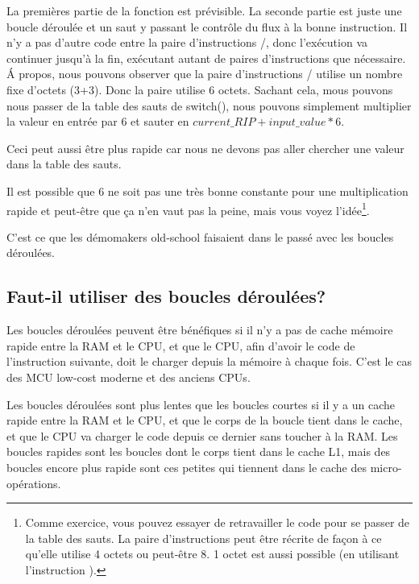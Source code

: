 La premières partie de la fonction est prévisible.
La seconde partie est juste une boucle déroulée et un saut y passant le contrôle
du flux à la bonne instruction.
Il n'y a pas d'autre code entre la paire d'instructions /, donc l'exécution
va continuer jusqu'à la fin, exécutant autant de paires d'instructions que nécessaire.
Á propos, nous pouvons observer que la paire d'instructions / utilise
un nombre fixe d'octets (3+3). Donc la paire utilise 6 octets.
Sachant cela, mous pouvons nous passer de la table des sauts de switch(), nous pouvons
simplement multiplier la valeur en entrée par 6 et sauter en $current\_RIP + input\_value * 6$.

Ceci peut aussi être plus rapide car nous ne devons pas aller chercher une valeur
dans la table des sauts.

Il est possible que 6 ne soit pas une très bonne constante pour une multiplication
rapide et peut-être que ça n'en vaut pas la peine, mais vous voyez l'idée\footnote{Comme
exercice, vous pouvez essayer de retravailler le code pour se passer de la table
des sauts.
La paire d'instructions peut être récrite de façon à ce qu'elle utilise 4 octets
ou peut-être 8.
1 octet est aussi possible (en utilisant l'instruction ).}.

C'est ce que les démomakers old-school faisaient dans le passé avec les boucles déroulées.

\subsection{Faut-il utiliser des boucles déroulées?}

Les boucles déroulées peuvent être bénéfiques si il n'y a pas de cache mémoire rapide
entre la \ac{RAM} et le \ac{CPU}, et que le \ac{CPU}, afin d'avoir le code de l'instruction
suivante, doit le charger depuis la mémoire à chaque fois.
C'est le cas des \ac{MCU} low-cost moderne et des anciens \ac{CPU}s.

Les boucles déroulées sont plus lentes que les boucles courtes si il y a un cache
rapide entre la \ac{RAM} et le \ac{CPU}, et que le corps de la boucle tient dans
le cache, et que le \ac{CPU} va charger le code depuis ce dernier sans toucher à
la \ac{RAM}.
Les boucles rapides sont les boucles dont le corps tient dans le cache L1, mais des
boucles encore plus rapide sont ces petites qui tiennent dans le cache des micro-opérations.

